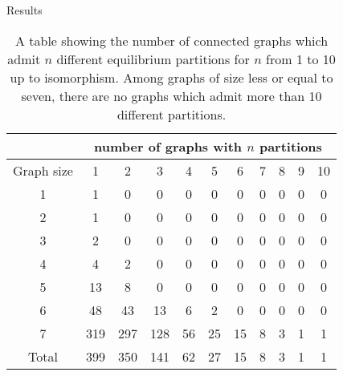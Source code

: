 \documentclass{beamer}
\begin{document}
\begin{frame}{Results}
	\begin{table}[]
		\centering
		\begin{tabular}{c|cccccccccc}
			&\multicolumn{10}{|c}{number of graphs with $n$ partitions}  \\
			\hline 
			Graph size&1&2&3&4&5&6&7&8&9&10\\
			\hline 
			1&1&0&0&0&0&0&0&0&0&0\\
			2&1&0&0&0&0&0&0&0&0&0\\
			3&2&0&0&0&0&0&0&0&0&0\\
			4&4&2&0&0&0&0&0&0&0&0\\
			5&13&8&0&0&0&0&0&0&0&0\\
			6&48&43&13&6&2&0&0&0&0&0\\
			7&319&297&128&56&25&15&8&3&1&1\\
			\hline
			Total&399&350&141&62&27&15&8&3&1&1
		\end{tabular}
		\caption{A table showing the number of connected graphs which admit $n$ different equilibrium partitions for $n$ from 1 to 10 up to isomorphism. Among graphs of size less or equal to seven, there are no graphs which admit more than 10 different partitions.}
		\label{tab:CountPartitionNumber}
	\end{table}
\end{frame}
\end{document}
